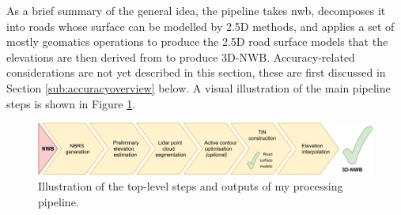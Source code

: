 As a brief summary of the general idea, the pipeline takes \ac{nwb}, decomposes it into roads whose surface can be modelled by 2.5D methods, and applies a set of mostly geomatics operations to produce the 2.5D road surface models that the elevations are then derived from to produce 3D-NWB. Accuracy-related considerations are not yet described in this section, these are first discussed in Section \ref{sub:accuracyoverview} below. A visual illustration of the main pipeline steps is shown in Figure \ref{fig:workflow}.

\begin{figure}[h]
    \centering
    \includegraphics[width=\linewidth]{final_report/figs/workflow_steps.pdf}
    \caption[Illustration of the top-level pipeline steps]{Illustration of the top-level steps and outputs of my processing pipeline.}
    \label{fig:workflow}
\end{figure}

